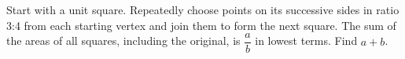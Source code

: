 Start with a unit square. Repeatedly choose points on its successive sides in ratio 3:4 from each starting vertex and join them to form the next square. The sum of the areas of all squares, including the original, is $\dfrac{a}{b}$ in lowest terms. Find $a+b$.

